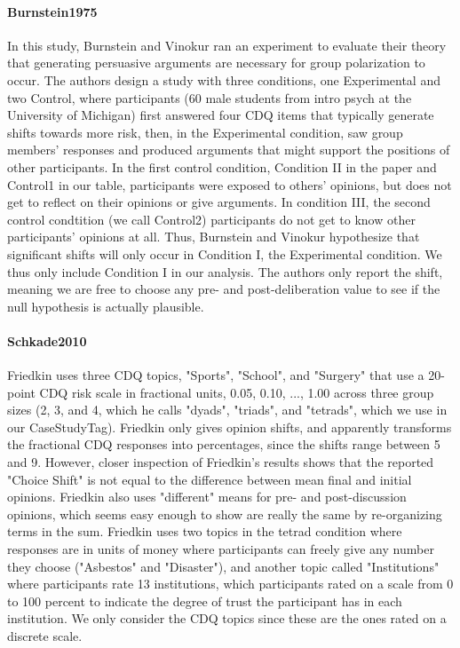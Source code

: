 \documentclass[11pt, letterpaper]{article}
\begin{document}
\paragraph{{Burnstein1975}} In this study, Burnstein and Vinokur ran an experiment to evaluate their theory
that generating persuasive arguments are necessary for group polarization to occur. The authors design a study with
three conditions, one Experimental and two Control, where participants (60 male students from intro psych at the
University of Michigan) first answered four CDQ items that typically generate shifts towards more risk, then, in the
Experimental condition, saw group members' responses and produced arguments that might support the positions of
other participants. In the first control condition, Condition II in the paper and Control1 in our table,
participants were exposed to others' opinions, but does not get to reflect on their opinions or give arguments. In
condition III, the second control condtition (we call Control2) participants do not get to know other participants'
opinions at all. Thus, Burnstein and Vinokur hypothesize that significant shifts will only occur in Condition I, the
Experimental condition. We thus only include Condition I in our analysis. The authors only report the shift, meaning
we are free to choose any pre- and post-deliberation value to see if the null hypothesis is actually plausible.  

\paragraph{{Schkade2010}} Friedkin uses three CDQ topics, "Sports", "School", and "Surgery" that use a
20-point CDQ risk scale in fractional units, 0.05, 0.10, ..., 1.00 across three group sizes (2, 3, and 4, which he
calls "dyads", "triads", and "tetrads", which we use in our CaseStudyTag). Friedkin only gives opinion shifts, and
apparently transforms the fractional CDQ responses into percentages, since the shifts range between 5 and 9.
However, closer inspection of Friedkin's results shows that the reported "Choice Shift" is not equal to the
difference between mean final and initial opinions. Friedkin also uses "different" means for pre- and
post-discussion opinions, which seems easy enough to show are really the same by re-organizing terms in the sum.
Friedkin uses two topics in the tetrad condition where responses are in units of money where participants can freely
give any number they choose ("Asbestos" and "Disaster"), and another topic called "Institutions" where participants
rate 13 institutions, which participants rated on a scale from 0 to 100 percent to indicate the degree of trust the
participant has in each institution. We only consider the CDQ topics since these are the ones rated on a discrete
scale. 
\end{document}

